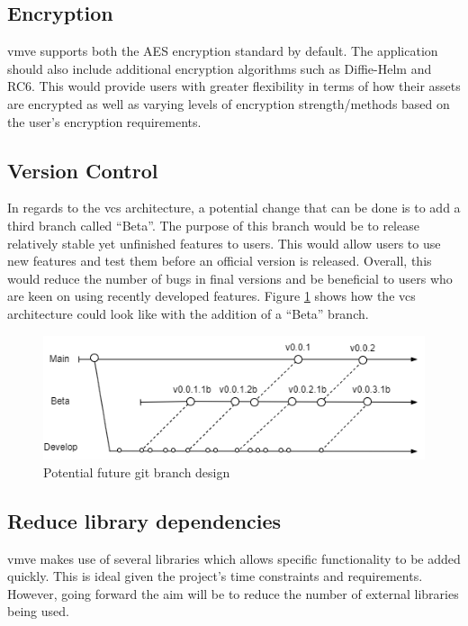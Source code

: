 \documentclass[11pt]{article}
\begin{document}
\subsection{Encryption}
\gls{vmve} supports both the AES encryption standard by default. The application
should also include additional encryption algorithms such as Diffie-Helm and
RC6. This would provide users with greater flexibility in terms of how their
assets are encrypted as well as varying levels of encryption strength/methods
based on the user's encryption requirements.

\subsection{Version Control}
In regards to the \gls{vcs} architecture, a potential change that can be done is
to add a third branch called ``Beta''. The purpose of this branch would be to
release relatively stable yet unfinished features to users. This would allow
users to use new features and test them before an official version is released.
Overall, this would reduce the number of bugs in final versions and be
beneficial to users who are keen on using recently developed features. Figure
\ref{fig:futurebrancharch} shows how the \gls{vcs} architecture could look like
with the addition of a ``Beta'' branch.

\begin{figure}[h!]
  \centering
  \includegraphics[width=\textwidth]{images/future_branch_design.png}
  \caption{Potential future git branch design}
  \label{fig:futurebrancharch}
\end{figure}

\subsection{Reduce library dependencies}
\gls{vmve} makes use of several libraries which allows specific functionality to
be added quickly. This is ideal given the project's time constraints and
requirements. However, going forward the aim will be to reduce the number of
external libraries being used.
\end{document}
